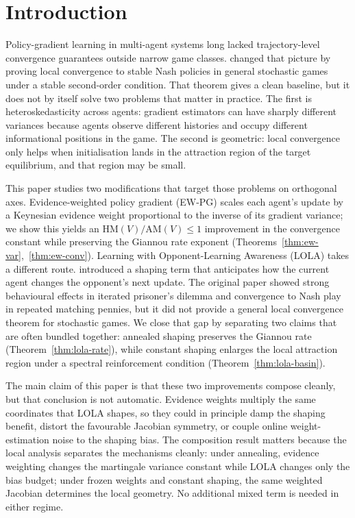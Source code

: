 \documentclass{article}
\theoremstyle{plain}
\theoremstyle{definition}
\theoremstyle{remark}
\newcommand{\HM}{\mathrm{HM}}
\newcommand{\AM}{\mathrm{AM}}
\begin{document}
\section{Introduction}

Policy-gradient learning in multi-agent systems long lacked trajectory-level convergence guarantees outside narrow game classes. \citet{giannou2022convergence} changed that picture by proving local convergence to stable Nash policies in general stochastic games under a stable second-order condition. That theorem gives a clean baseline, but it does not by itself solve two problems that matter in practice. The first is heteroskedasticity across agents: gradient estimators can have sharply different variances because agents observe different histories and occupy different informational positions in the game. The second is geometric: local convergence only helps when initialisation lands in the attraction region of the target equilibrium, and that region may be small.

This paper studies two modifications that target those problems on orthogonal axes. Evidence-weighted policy gradient (EW-PG) scales each agent's update by a Keynesian evidence weight proportional to the inverse of its gradient variance; we show this yields an $\HM(V)/\AM(V)\le 1$ improvement in the convergence constant while preserving the Giannou rate exponent (Theorems~\ref{thm:ew-var},~\ref{thm:ew-conv}). Learning with Opponent-Learning Awareness (LOLA) takes a different route. \citet{foerster2018lola} introduced a shaping term that anticipates how the current agent changes the opponent's next update. The original paper showed strong behavioural effects in iterated prisoner's dilemma and convergence to Nash play in repeated matching pennies, but it did not provide a general local convergence theorem for stochastic games. We close that gap by separating two claims that are often bundled together: annealed shaping preserves the Giannou rate (Theorem~\ref{thm:lola-rate}), while constant shaping enlarges the local attraction region under a spectral reinforcement condition (Theorem~\ref{thm:lola-basin}).

The main claim of this paper is that these two improvements compose cleanly, but that conclusion is not automatic. Evidence weights multiply the same coordinates that LOLA shapes, so they could in principle damp the shaping benefit, distort the favourable Jacobian symmetry, or couple online weight-estimation noise to the shaping bias. The composition result matters because the local analysis separates the mechanisms cleanly: under annealing, evidence weighting changes the martingale variance constant while LOLA changes only the bias budget; under frozen weights and constant shaping, the same weighted Jacobian determines the local geometry. No additional mixed term is needed in either regime.
\end{document}
